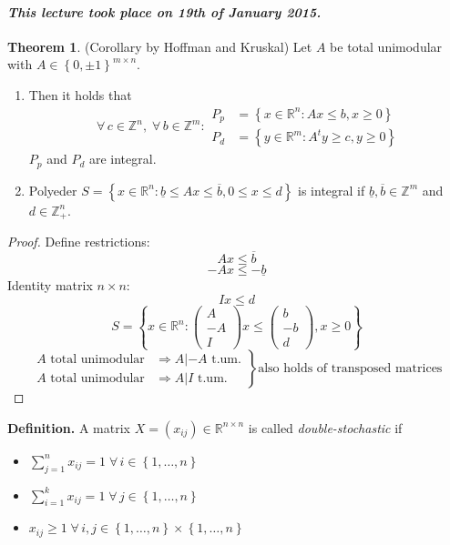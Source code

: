 \documentclass[a4paper]{article}
\theoremstyle{definition}
\newtheorem{theorem}{Theorem}
\newcommand{\set}[1]{\left\{#1\right\}}
\newcommand{\dateref}[1]{\paragraph{\textit{This lecture took place on #1.}}}
\newcommand{\fall}{\;\forall\,}
\begin{document}
\dateref{19th of January 2015}

\begin{theorem}
  (Corollary by Hoffman and Kruskal)
  Let $A$ be total unimodular with $A \in \set{0, \pm 1}^{m \times n}$.
  \begin{enumerate}
    \item Then it holds that
      \[
        \fall c \in \mathbb{Z}^n, \fall b \in \mathbb{Z}^m:
          \begin{array}{rl}
            P_p &= \set{x \in \mathbb{R}^n: Ax \leq b, x \geq 0} \\
            P_d &= \set{y \in \mathbb{R}^m: A^t y \geq c, y \geq 0}
          \end{array}
      \]
      $P_p$ and $P_d$ are integral.
    \item Polyeder $S = \set{x \in \mathbb{R}^n: \underline{b} \leq Ax \leq \overline{b}, 0 \leq x \leq d}$
      is integral if $\underline{b}, \overline{b} \in \mathbb{Z}^m$ and $d \in \mathbb{Z}_+^n$.
  \end{enumerate}
\end{theorem}

\begin{proof}
  Define restrictions:
  \[ Ax \leq \overline{b} \]
  \[ -Ax \leq -\underline{b} \]
  Identity matrix $n \times n$:
  \[ Ix \leq d \]
  \[
    S = \set{
      x \in \mathbb{R}^n:
        \begin{pmatrix} A \\ -A \\ I\end{pmatrix} x \leq
        \begin{pmatrix} b \\ -b \\ d\end{pmatrix}, x \geq 0
    }
  \] \[
    \left.\begin{array}{ll}
      A \text{ total unimodular} &\Rightarrow A | -A \text{ t.um.} \\
      A \text{ total unimodular} &\Rightarrow A | I \text{ t.um.}
    \end{array}\right\}
    \text{also holds of transposed matrices}
  \]
\end{proof}

\textbf{Definition.}
  A matrix $X = (x_{ij}) \in \mathbb{R}^{n \times n}$ is called \emph{double-stochastic} if
  \begin{itemize}
    \item $\sum_{j=1}^n x_{ij} = 1 \fall i \in \set{1, \ldots, n}$
    \item $\sum_{i=1}^k x_{ij} = 1 \fall j \in \set{1, \ldots, n}$
    \item $x_{ij} \geq 1 \fall i,j \in \set{1, \ldots, n} \times \set{1, \ldots, n}$
  \end{itemize}
\end{document}
